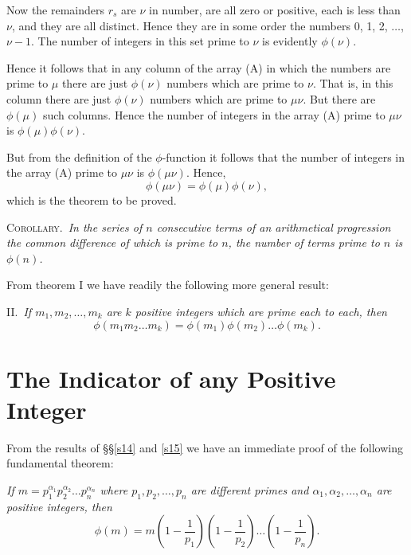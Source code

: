 \documentclass[oneside]{book}
\begin{document}
Now the remainders $r_s$ are $\nu$ in number, are all zero or
positive, each is less than $\nu$, and they are all distinct. Hence
they are in some order the numbers 0, 1, 2, $\ldots$, $\nu-1$. The
number of integers in this set prime to $\nu$ is evidently
$\phi(\nu)$.

Hence it follows that in any column of the array (A) in which the
numbers are prime to $\mu$ there are just $\phi(\nu)$ numbers which
are prime to $\nu$. That is, in this column there are just
$\phi(\nu)$ numbers which are prime to $\mu\nu$. But there are
$\phi(\mu)$ such columns. Hence the number of integers in the array
(A) prime to $\mu\nu$ is $\phi(\mu)\phi(\nu)$.

But from the definition of the $\phi$-function it follows that the
number of integers in the array (A) prime to $\mu\nu$ is
$\phi(\mu\nu).$ Hence,
\begin{equation*}
\phi(\mu\nu) = \phi(\mu)\phi(\nu),
\end{equation*} which is the theorem to be proved.

\smallskip \textsc{Corollary.}~\emph{In the series of $n$
consecutive terms of an arithmetical progression the common
difference of which is prime to $n$, the number of terms prime to
$n$ is $\phi(n)$.}

From theorem I we have readily the following more general result:

\smallskip II.~\emph{If $m_1, m_2, \ldots, m_k$ are $k$ positive
integers which are prime each to each, then}
\begin{equation*}
\phi(m_1 m_2 \ldots m_k) = \phi(m_1) \phi(m_2) \ldots \phi(m_k).
\end{equation*}

\section{The Indicator of any Positive Integer}\label{s16}%

From the results of \S\S \ref{s14} and \ref{s15} we have an
immediate proof of the following fundamental theorem:

\emph{If $m = p_1^{\alpha_1} p_2^{\alpha_2} \ldots p_n^{\alpha_n}$
where $p_1, p_2, \ldots, p_n$ are different primes and $\alpha_1,
\alpha_2, \ldots, \alpha_n$ are positive integers, then}
\begin{equation*}
\phi(m) = m \left ( 1-\frac{1}{p_1} \right )
            \left ( 1-\frac{1}{p_2} \right )
            \ldots
            \left ( 1-\frac{1}{p_n} \right ).
\end{equation*}
\end{document}

